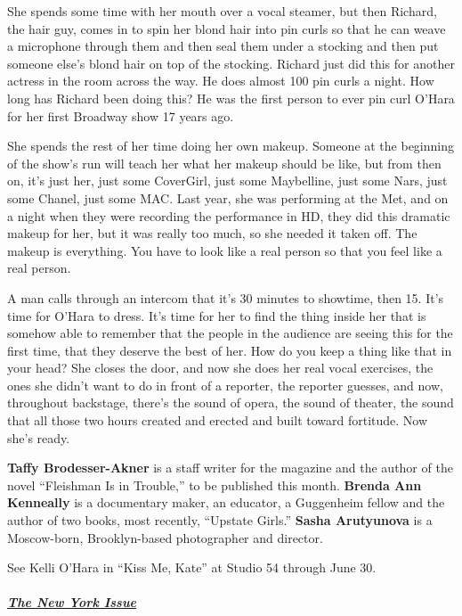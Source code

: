 She spends some time with her mouth over a vocal steamer, but then
Richard, the hair guy, comes in to spin her blond hair into pin curls so
that he can weave a microphone through them and then seal them under a
stocking and then put someone else's blond hair on top of the stocking.
Richard just did this for another actress in the room across the way. He
does almost 100 pin curls a night. How long has Richard been doing this?
He was the first person to ever pin curl O'Hara for her first Broadway
show 17 years ago.

She spends the rest of her time doing her own makeup. Someone at the
beginning of the show's run will teach her what her makeup should be
like, but from then on, it's just her, just some CoverGirl, just some
Maybelline, just some Nars, just some Chanel, just some MAC. Last year,
she was performing at the Met, and on a night when they were recording
the performance in HD, they did this dramatic makeup for her, but it was
really too much, so she needed it taken off. The makeup is everything.
You have to look like a real person so that you feel like a real person.

A man calls through an intercom that it's 30 minutes to showtime, then
15. It's time for O'Hara to dress. It's time for her to find the thing
inside her that is somehow able to remember that the people in the
audience are seeing this for the first time, that they deserve the best
of her. How do you keep a thing like that in your head? She closes the
door, and now she does her real vocal exercises, the ones she didn't
want to do in front of a reporter, the reporter guesses, and now,
throughout backstage, there's the sound of opera, the sound of theater,
the sound that all those two hours created and erected and built toward
fortitude. Now she's ready.

\textbf{Taffy Brodesser-Akner} is a staff writer for the magazine and
the author of the novel ``Fleishman Is in Trouble,'' to be published
this month. \textbf{Brenda Ann Kenneally} is a documentary maker, an
educator, a Guggenheim fellow and the author of two books, most
recently, ``Upstate Girls.'' \textbf{Sasha Arutyunova} is a Moscow-born,
Brooklyn-based photographer and director.

See Kelli O'Hara in ``Kiss Me, Kate'' at Studio 54 through June 30.

\hypertarget{the-new-york-issue-1}{%
\subparagraph{\texorpdfstring{\href{https://www.nytimes3xbfgragh.onion/interactive/2019/05/30/magazine/performers-new-york.html}{The
New York Issue}}{The New York Issue}}\label{the-new-york-issue-1}}

